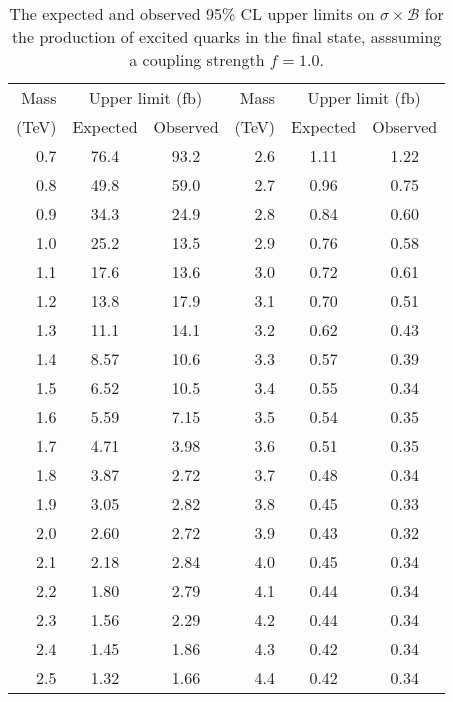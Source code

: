 \begin{table}[h!]
\centering
\begin{tabular}{rcc|rcc}
\hline
Mass    & \multicolumn{2}{c}{Upper limit (fb)} &  Mass  & \multicolumn{2}{c}{Upper limit (fb)} \\
(\unit{TeV})   & Expected & Observed & (\unit{TeV}) & Expected & Observed \\ 
\hline
0.7  &  76.4 &  93.2 & 2.6 &  1.11 &  1.22 \\
0.8  &  49.8 &  59.0 & 2.7 &  0.96 &  0.75 \\
0.9  &  34.3 &  24.9 & 2.8 &  0.84 &  0.60 \\
1.0 &  25.2 &  13.5 & 2.9 &  0.76 &  0.58 \\
1.1 &  17.6 &  13.6 & 3.0 &  0.72 &  0.61 \\
1.2 &  13.8 &  17.9 & 3.1 &  0.70 &  0.51 \\
1.3 &  11.1 &  14.1 & 3.2 &  0.62 &  0.43 \\
1.4 &   8.57 &  10.6 & 3.3 &  0.57 &  0.39 \\
1.5 &   6.52 &  10.5 & 3.4 &  0.55 &  0.34 \\
1.6 &   5.59 &   7.15 & 3.5 &  0.54 &  0.35 \\
1.7 &   4.71 &   3.98 & 3.6 &  0.51 &  0.35 \\
1.8 &   3.87 &   2.72 & 3.7 &  0.48 &  0.34 \\
1.9 &   3.05 &   2.82 & 3.8 &  0.45 &  0.33 \\
2.0 &   2.60 &   2.72 & 3.9 &  0.43 &  0.32 \\
2.1 &   2.18 &   2.84 & 4.0 &  0.45 &  0.34 \\
2.2 &   1.80 &   2.79 & 4.1 &  0.44 &  0.34 \\
2.3 &   1.56 &   2.29 & 4.2 &  0.44 &  0.34 \\
2.4 &   1.45 &   1.86 & 4.3 &  0.42 &  0.34 \\
2.5 &   1.32 &   1.66 & 4.4 &  0.42 &  0.34 \\
\hline
\end{tabular}
  \caption{The expected and observed 95\% CL upper limits on $\sigma\times\mathcal{B}$ for the production of excited quarks in the \gamjet final state, asssuming a coupling strength $f=1.0$.}
   \label{Table:ObsLimits}
\end{table}

